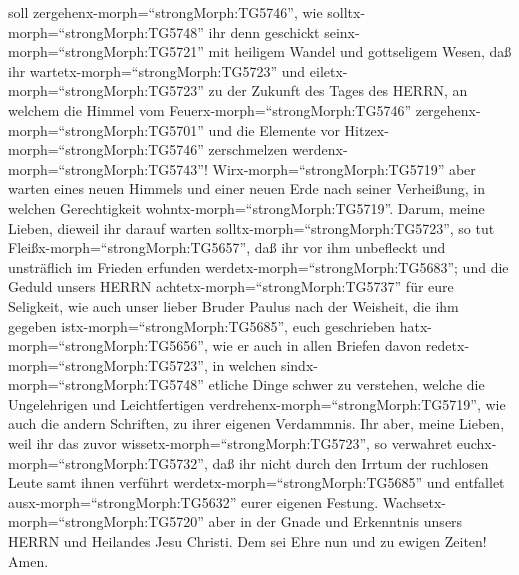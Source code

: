 soll zergehenx-morph=``strongMorph:TG5746'', wie
solltx-morph=``strongMorph:TG5748'' ihr denn geschickt
seinx-morph=``strongMorph:TG5721'' mit heiligem Wandel und gottseligem
Wesen,  daß ihr wartetx-morph=``strongMorph:TG5723'' und
eiletx-morph=``strongMorph:TG5723'' zu der Zukunft des Tages des HERRN,
an welchem die Himmel vom Feuerx-morph=``strongMorph:TG5746''
zergehenx-morph=``strongMorph:TG5701'' und die Elemente vor
Hitzex-morph=``strongMorph:TG5746'' zerschmelzen
werdenx-morph=``strongMorph:TG5743''! 
Wirx-morph=``strongMorph:TG5719'' aber warten eines neuen Himmels und
einer neuen Erde nach seiner Verheißung, in welchen Gerechtigkeit
wohntx-morph=``strongMorph:TG5719''.  Darum, meine Lieben,
dieweil ihr darauf warten solltx-morph=``strongMorph:TG5723'', so tut
Fleißx-morph=``strongMorph:TG5657'', daß ihr vor ihm unbefleckt und
unsträflich im Frieden erfunden werdetx-morph=``strongMorph:TG5683'';
 und die Geduld unsers HERRN
achtetx-morph=``strongMorph:TG5737'' für eure Seligkeit, wie auch unser
lieber Bruder Paulus nach der Weisheit, die ihm gegeben
istx-morph=``strongMorph:TG5685'', euch geschrieben
hatx-morph=``strongMorph:TG5656'',  wie er auch in allen
Briefen davon redetx-morph=``strongMorph:TG5723'', in welchen
sindx-morph=``strongMorph:TG5748'' etliche Dinge schwer zu verstehen,
welche die Ungelehrigen und Leichtfertigen
verdrehenx-morph=``strongMorph:TG5719'', wie auch die andern Schriften,
zu ihrer eigenen Verdammnis.  Ihr aber, meine Lieben, weil
ihr das zuvor wissetx-morph=``strongMorph:TG5723'', so verwahret
euchx-morph=``strongMorph:TG5732'', daß ihr nicht durch den Irrtum der
ruchlosen Leute samt ihnen verführt werdetx-morph=``strongMorph:TG5685''
und entfallet ausx-morph=``strongMorph:TG5632'' eurer eigenen Festung.
 Wachsetx-morph=``strongMorph:TG5720'' aber in der Gnade
und Erkenntnis unsers HERRN und Heilandes Jesu Christi. Dem sei Ehre nun
und zu ewigen Zeiten! Amen.
